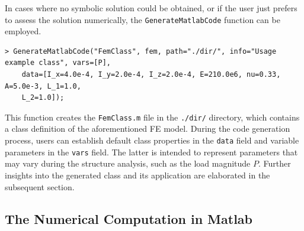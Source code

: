 In cases where no symbolic solution could be obtained, or if the user just prefers to assess the solution numerically, the \texttt{GenerateMatlabCode} function can be employed.
%
\begin{verbatim}
> GenerateMatlabCode("FemClass", fem, path="./dir/", info="Usage example class", vars=[P],
    data=[I_x=4.0e-4, I_y=2.0e-4, I_z=2.0e-4, E=210.0e6, nu=0.33, A=5.0e-3, L_1=1.0,
    L_2=1.0]);
\end{verbatim}
%
This function creates the \texttt{FemClass.m} file in the \texttt{./dir/} directory, which contains a class definition of the aforementioned \ac{FE} model. During the code generation process, users can establish default class properties in the \texttt{data} field and variable parameters in the \texttt{vars} field. The latter is intended to represent parameters that may vary during the structure analysis, such as the load magnitude $P$. Further insights into the generated class and its application are elaborated in the subsequent section.

\subsection[The Numerical Computation in \Matlab{}]{The Numerical Computation in Matlab}
\label{app4:subsec:numerical_computation}

